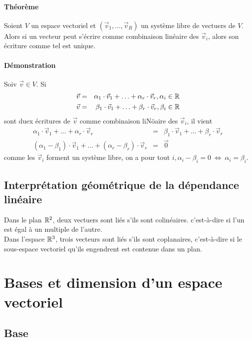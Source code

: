 \paragraph*{Théorème} Soient $V$ un espace vectoriel et $(\vec{v}_1, \ldots, \vec{v}_R)$ un système libre de vectuers de $V$. Alors si un vecteur peut s'écrire comme combinaison linéaire des $\vec{v}_i$, alors son écriture comme tel est unique.

\paragraph{Démonstration} Soiv $\vec{v} \in V$. Si 
\begin{eqnarray*}
  \vec{v} &=& \alpha_1 \cdot \vec{v}_1 + \ldots + \alpha_r \cdot \vec{v}_r, \alpha_i \in \mathbb{R} \\
  \vec{v} &=& \beta_1 \cdot \vec{v}_1 + \ldots + \beta_r \cdot \vec{v}_r, \beta_i \in \mathbb{R} 
\end{eqnarray*}
sont duex écritures de $\vec{v}$ comme combinaison liNöaire des $\vec{v}_i$, il vient
\begin{eqnarray*}
  \alpha_1 \cdot \vec{v}_1 + \ldots + \alpha_r \cdot \vec{v}_r &=& \beta_1 \cdot \vec{v}_1 + \ldots + \beta_r \cdot \vec{v}_r \\
  (\alpha_1 - \beta_1) \cdot \vec{v}_1 + \ldots + (\alpha_r - \beta_r) \cdot \vec{v}_r &=& \vec{0}
\end{eqnarray*}
comme les $\vec{v}_i$ forment un système libre, on a pour tout $i, \alpha_i - \beta_i = 0 ~\Leftrightarrow~ \alpha_i = \beta_i$.

\subsection{Interprétation géométrique de la dépendance linéaire}
Dans le plan $\mathbb{R}^2$, deux vectuers sont liés s'ils sont colinéaires. c'est-à-dire si l'un est égal à un multiple de l'autre. \\
Dans l'espace $\mathbb{R}^3$, trois vecteurs sont liés s'ils sont coplanaires, c'est-à-dire si le sous-espace vectoriel qu'ils engendrent est contenue dans un plan.

%
%
\section{Bases et dimension d'un espace vectoriel}
%
%

%
\subsection{Base}
%
